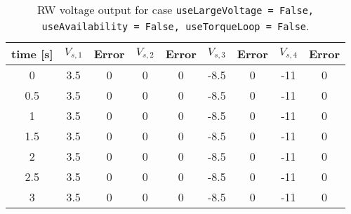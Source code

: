 \begin{table}[htbp]\caption{RW voltage output for case {\tt useLargeVoltage = False, useAvailability = False, useTorqueLoop = False}.}\label{tbl:testFalseFalseFalse}\centering\begin{tabular}{ccccccccc}
\hline
  time [s]  &  $V_{s,1}$  &  Error  &  $V_{s,2}$  &  Error  &  $V_{s,3}$  &  Error  &  $V_{s,4}$  &  Error  \\
\hline
     0      &     3.5     &    0    &      0      &    0    &    -8.5     &    0    &     -11     &    0    \\
    0.5     &     3.5     &    0    &      0      &    0    &    -8.5     &    0    &     -11     &    0    \\
     1      &     3.5     &    0    &      0      &    0    &    -8.5     &    0    &     -11     &    0    \\
    1.5     &     3.5     &    0    &      0      &    0    &    -8.5     &    0    &     -11     &    0    \\
     2      &     3.5     &    0    &      0      &    0    &    -8.5     &    0    &     -11     &    0    \\
    2.5     &     3.5     &    0    &      0      &    0    &    -8.5     &    0    &     -11     &    0    \\
     3      &     3.5     &    0    &      0      &    0    &    -8.5     &    0    &     -11     &    0    \\
\hline\end{tabular}\end{table}